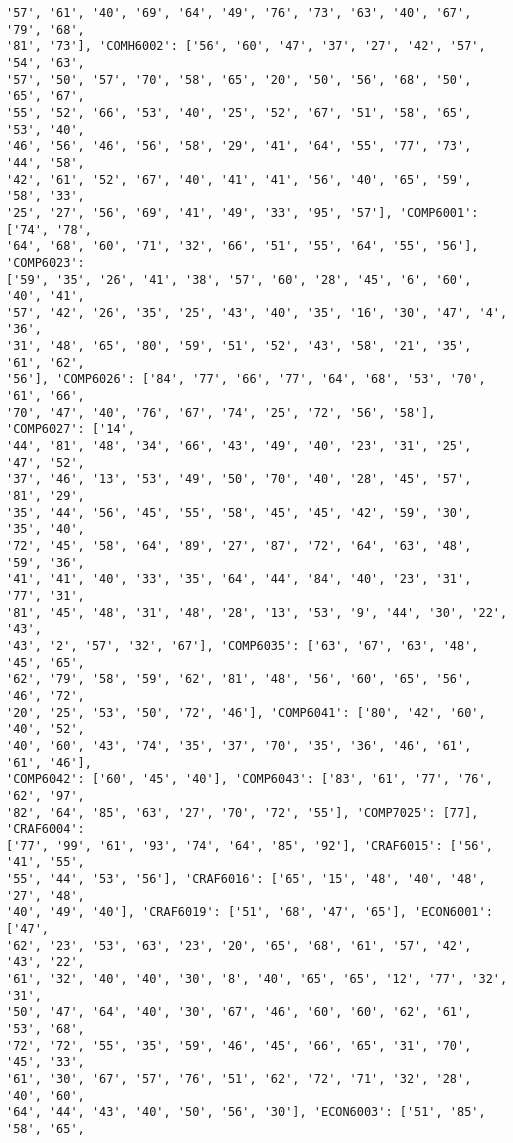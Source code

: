 \documentclass[11pt]{article}
\begin{document}
\begin{Verbatim}[commandchars=\\\{\}]
'57', '61', '40', '69', '64', '49', '76', '73', '63', '40', '67', '79', '68',
'81', '73'], 'COMH6002': ['56', '60', '47', '37', '27', '42', '57', '54', '63',
'57', '50', '57', '70', '58', '65', '20', '50', '56', '68', '50', '65', '67',
'55', '52', '66', '53', '40', '25', '52', '67', '51', '58', '65', '53', '40',
'46', '56', '46', '56', '58', '29', '41', '64', '55', '77', '73', '44', '58',
'42', '61', '52', '67', '40', '41', '41', '56', '40', '65', '59', '58', '33',
'25', '27', '56', '69', '41', '49', '33', '95', '57'], 'COMP6001': ['74', '78',
'64', '68', '60', '71', '32', '66', '51', '55', '64', '55', '56'], 'COMP6023':
['59', '35', '26', '41', '38', '57', '60', '28', '45', '6', '60', '40', '41',
'57', '42', '26', '35', '25', '43', '40', '35', '16', '30', '47', '4', '36',
'31', '48', '65', '80', '59', '51', '52', '43', '58', '21', '35', '61', '62',
'56'], 'COMP6026': ['84', '77', '66', '77', '64', '68', '53', '70', '61', '66',
'70', '47', '40', '76', '67', '74', '25', '72', '56', '58'], 'COMP6027': ['14',
'44', '81', '48', '34', '66', '43', '49', '40', '23', '31', '25', '47', '52',
'37', '46', '13', '53', '49', '50', '70', '40', '28', '45', '57', '81', '29',
'35', '44', '56', '45', '55', '58', '45', '45', '42', '59', '30', '35', '40',
'72', '45', '58', '64', '89', '27', '87', '72', '64', '63', '48', '59', '36',
'41', '41', '40', '33', '35', '64', '44', '84', '40', '23', '31', '77', '31',
'81', '45', '48', '31', '48', '28', '13', '53', '9', '44', '30', '22', '43',
'43', '2', '57', '32', '67'], 'COMP6035': ['63', '67', '63', '48', '45', '65',
'62', '79', '58', '59', '62', '81', '48', '56', '60', '65', '56', '46', '72',
'20', '25', '53', '50', '72', '46'], 'COMP6041': ['80', '42', '60', '40', '52',
'40', '60', '43', '74', '35', '37', '70', '35', '36', '46', '61', '61', '46'],
'COMP6042': ['60', '45', '40'], 'COMP6043': ['83', '61', '77', '76', '62', '97',
'82', '64', '85', '63', '27', '70', '72', '55'], 'COMP7025': [77], 'CRAF6004':
['77', '99', '61', '93', '74', '64', '85', '92'], 'CRAF6015': ['56', '41', '55',
'55', '44', '53', '56'], 'CRAF6016': ['65', '15', '48', '40', '48', '27', '48',
'40', '49', '40'], 'CRAF6019': ['51', '68', '47', '65'], 'ECON6001': ['47',
'62', '23', '53', '63', '23', '20', '65', '68', '61', '57', '42', '43', '22',
'61', '32', '40', '40', '30', '8', '40', '65', '65', '12', '77', '32', '31',
'50', '47', '64', '40', '30', '67', '46', '60', '60', '62', '61', '53', '68',
'72', '72', '55', '35', '59', '46', '45', '66', '65', '31', '70', '45', '33',
'61', '30', '67', '57', '76', '51', '62', '72', '71', '32', '28', '40', '60',
'64', '44', '43', '40', '50', '56', '30'], 'ECON6003': ['51', '85', '58', '65',

\end{Verbatim}
\end{document}
